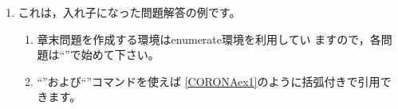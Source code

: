 \begin{Answer}
\begin{enumerate}
\newpage
\item
これは，入れ子になった問題解答の例です。
\begin{enumerate}
\item
章末問題を作成する環境はenumerate環境を利用してい
ますので，各問題は``\verb@\item@''で始めて下さい。

\item
``\verb@{}''および``\verb@{}''コマンドを使えば
\ref{CORONAex1}のように括弧付きで引用できます。
\end{enumerate}
\end{enumerate}


\end{Answer}
